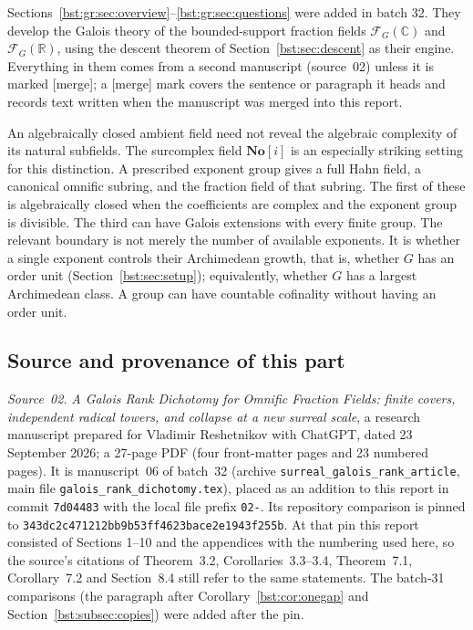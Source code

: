 \documentclass[11pt,letterpaper]{article}
\theoremstyle{definition}
\theoremstyle{remark}
\newcommand{\R}{\mathbb R}
\newcommand{\C}{\mathbb C}
\newcommand{\No}{\mathbf{No}}
\newcommand{\FF}[2]{\mathcal F_{#2}(#1)}
\newcommand{\grpin}{\texttt{343dc2c471212bb9b53ff4623bace2e1943f255b}}
\begin{document}
Sections~\ref{bst:gr:sec:overview}--\ref{bst:gr:sec:questions} were added
in batch 32. They develop the Galois theory of the bounded-support fraction
fields $\FF{\C}G$ and $\FF{\R}G$, using the descent theorem of
Section~\ref{bst:sec:descent} as their engine. Everything in them comes from
a second manuscript (source~02) unless it is marked \textup{[merge]}; a
\textup{[merge]} mark covers the sentence or paragraph it heads and records
text written when the manuscript was merged into this report.

An algebraically closed ambient field need not reveal the algebraic
complexity of its natural subfields. The surcomplex field $\No[i]$ is an
especially striking setting for this distinction. A prescribed exponent
group gives a full Hahn field, a canonical omnific subring, and the
fraction field of that subring. The first of these is algebraically closed
when the coefficients are complex and the exponent group is divisible.
The third can have Galois extensions with every finite group. The relevant
boundary is not merely the number of available exponents. It is whether a
single exponent controls their Archimedean growth, that is, whether $G$ has
an order unit (Section~\ref{bst:sec:setup}); equivalently, whether $G$ has a
largest Archimedean class. A group can have countable cofinality without
having an order unit.

\subsection{Source and provenance of this part}\label{bst:gr:subsec:source}

\emph{Source~02.} \emph{A Galois Rank Dichotomy for Omnific Fraction Fields:
finite covers, independent radical towers, and collapse at a new surreal
scale}, a research manuscript prepared for Vladimir Reshetnikov with
ChatGPT, dated 23 September 2026; a 27-page PDF (four front-matter pages and
23 numbered pages). It is manuscript~06 of batch~32 (archive
\texttt{surreal\_galois\_rank\_article}, main file
\texttt{galois\_rank\_dichotomy.tex}), placed as an addition to this report
in commit \texttt{7d04483} with the local file prefix \texttt{02-}. Its
repository comparison is pinned to \grpin. At that pin this report consisted
of Sections 1--10 and the appendices with the numbering used here, so the
source's citations of Theorem~3.2, Corollaries~3.3--3.4, Theorem~7.1,
Corollary~7.2 and Section~8.4 still refer to the same statements. The
batch-31 comparisons (the paragraph after Corollary~\ref{bst:cor:onegap} and
Section~\ref{bst:subsec:copies}) were added after the pin.
\end{document}
